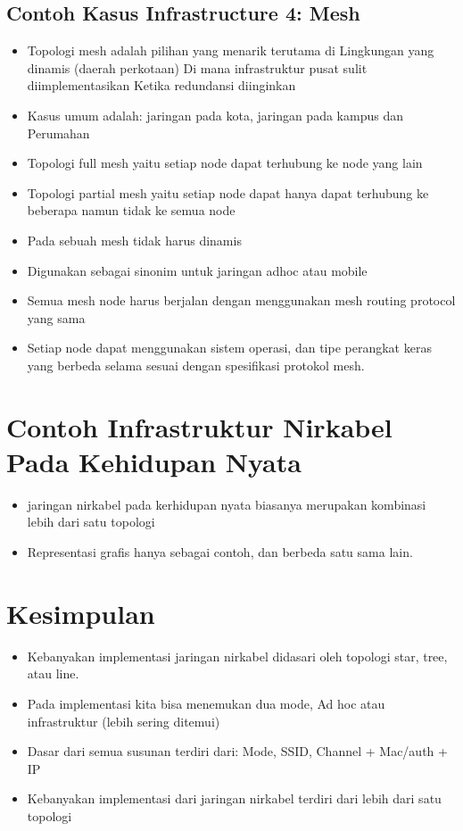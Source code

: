 \documentclass[a4paper,12pt]{article}
\begin{document}
\subsection{Contoh Kasus Infrastructure 4: Mesh}
\begin{itemize}
    \item Topologi mesh adalah pilihan yang menarik terutama di
        \subitem Lingkungan yang dinamis (daerah perkotaan)
        \subitem Di mana infrastruktur pusat sulit diimplementasikan
        \subitem Ketika redundansi diinginkan
    \item Kasus umum adalah: jaringan pada kota, jaringan pada kampus dan Perumahan
    \item Topologi full mesh yaitu setiap node dapat terhubung ke node yang lain
    \item Topologi partial mesh yaitu setiap node dapat hanya dapat terhubung ke beberapa namun tidak ke semua node
    \item Pada sebuah mesh tidak harus dinamis
    \item Digunakan sebagai sinonim untuk jaringan adhoc atau mobile
    \item Semua mesh node harus berjalan dengan menggunakan mesh routing protocol yang sama
    \item Setiap node dapat menggunakan sistem operasi, dan tipe perangkat keras yang berbeda selama sesuai dengan
        spesifikasi protokol mesh.
\end{itemize}

\section{Contoh Infrastruktur Nirkabel Pada Kehidupan Nyata}
\begin{itemize}
    \item jaringan nirkabel pada kerhidupan nyata biasanya merupakan kombinasi lebih dari satu topologi
    \item Representasi grafis hanya sebagai contoh, dan berbeda satu sama lain.
\end{itemize}

\newpage

\section{Kesimpulan}
\begin{itemize}
    \item Kebanyakan implementasi jaringan nirkabel didasari oleh topologi star, tree, atau line.
    \item Pada implementasi kita bisa menemukan dua mode, Ad hoc atau infrastruktur (lebih sering ditemui)
    \item Dasar dari semua susunan terdiri dari:
        \subitem Mode, SSID, Channel + Mac/auth + IP
    \item Kebanyakan implementasi dari jaringan nirkabel terdiri dari lebih dari satu topologi
\end{itemize}
\end{document}
